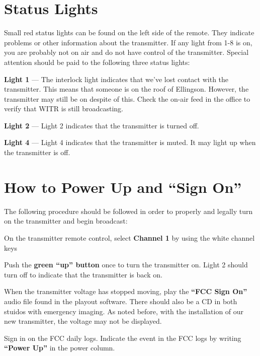\documentclass{witrman}
\begin{document}
\section{Status Lights}
Small red status lights can be found on the left side of the remote. They
indicate problems or other information about the transmitter. If any light from
1-8 is on, you are probably not on air and do not have control of the
transmitter. Special attention should be paid to the following three status
lights:
\begin{skinnyitemize}
    \item \textbf{Light 1} --- The interlock light indicates that we’ve lost
        contact with the transmitter. This means that someone is on the roof of
        Ellingson. However, the transmitter may still be on despite of this.
        Check the on-air feed in the office to verify that WITR is still
        broadcasting.
    \item \textbf{Light 2} --- Light 2 indicates that the transmitter is turned
        off.
    \item \textbf{Light 4} --- Light 4 indicates that the transmitter is muted.
        It may light up when the transmitter is off.
\end{skinnyitemize}

\section{How to Power Up and ``Sign On''}
The following procedure should be followed in order to properly and legally turn
on the transmitter and begin broadcast:
\begin{skinnyenumerate}
    \item On the transmitter remote control, select \textbf{Channel 1} by using
        the white channel keys
    \item Push the \textbf{green ``up'' button} once to turn the transmitter on.
        Light 2 should turn off to indicate that the transmitter is back on.
    \item When the transmitter voltage has stopped moving, play the
        \textbf{``FCC Sign On''} audio file found in the playout software. There
        should also be a CD in both stuidos with emergency imaging. As noted
        before, with the installation of our new transmitter, the voltage may
        not be displayed.
    \item Sign in on the FCC daily logs. Indicate the event in the FCC logs by
        writing \textbf{``Power Up''} in the power column.
\end{skinnyenumerate}
\end{document}
